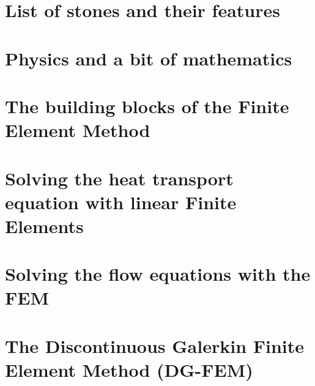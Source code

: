 \documentclass[a4paper]{article}
\numberwithin{equation}{section}
\begin{document}
\newpage
\section{List of stones and their features} %
 

\newpage
\section{Physics and a bit of mathematics} \label{chapt3} %
 

\newpage
\section{The building blocks of the Finite Element Method} %


\newpage 
\section{Solving the heat transport equation with linear Finite Elements \label{chapt5}} %


\newpage 
\section{Solving the flow equations with the FEM} \label{solvingFEM} %


\newpage
\section{The Discontinuous Galerkin Finite Element Method (DG-FEM) \label{dgfem}} %


\newpage
\end{document}
